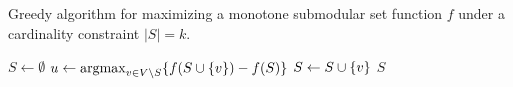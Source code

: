\begin{algorithm}[tb]
\caption{Greedy algorithm for maximizing a monotone submodular set function $f$
under a cardinality constraint $|S| = k$.}
\label{algo:gh-greedy}
\begin{algorithmic}[1]
\State$S \gets \emptyset$
\State$u \gets \argmax_{v \in V \setminus S}\set{f(S \cup \set{v}) - f(S)}$
\State$S \gets S\cup\set{v}$
\EndWhile
\State\Return$S$
\end{algorithmic}
\end{algorithm}

